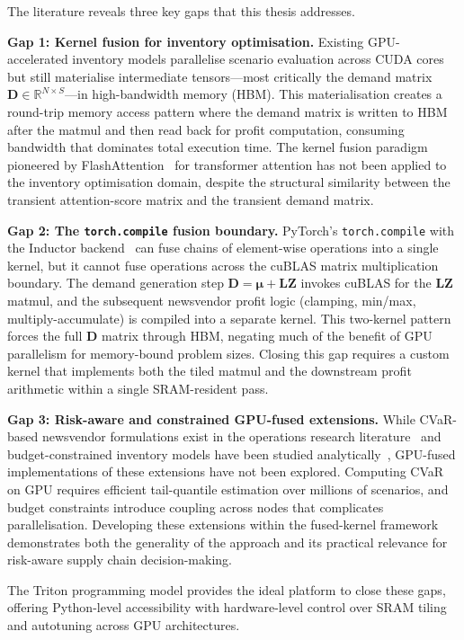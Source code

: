 The literature reveals three key gaps that this thesis addresses.

\textbf{Gap 1: Kernel fusion for inventory optimisation.} Existing GPU-accelerated inventory models parallelise scenario evaluation across CUDA cores but still materialise intermediate tensors---most critically the demand matrix $\mathbf{D} \in \mathbb{R}^{N \times S}$---in high-bandwidth memory (HBM). This materialisation creates a round-trip memory access pattern where the demand matrix is written to HBM after the matmul and then read back for profit computation, consuming bandwidth that dominates total execution time. The kernel fusion paradigm pioneered by FlashAttention~\citep{dao2022} for transformer attention has not been applied to the inventory optimisation domain, despite the structural similarity between the transient attention-score matrix and the transient demand matrix.

\textbf{Gap 2: The \texttt{torch.compile} fusion boundary.} PyTorch's \texttt{torch.compile} with the Inductor backend~\citep{ansel2024} can fuse chains of element-wise operations into a single kernel, but it cannot fuse operations across the cuBLAS matrix multiplication boundary. The demand generation step $\mathbf{D} = \bm{\mu} + \mathbf{L}\mathbf{Z}$ invokes cuBLAS for the $\mathbf{L}\mathbf{Z}$ matmul, and the subsequent newsvendor profit logic (clamping, min/max, multiply-accumulate) is compiled into a separate kernel. This two-kernel pattern forces the full $\mathbf{D}$ matrix through HBM, negating much of the benefit of GPU parallelism for memory-bound problem sizes. Closing this gap requires a custom kernel that implements both the tiled matmul and the downstream profit arithmetic within a single SRAM-resident pass.

\textbf{Gap 3: Risk-aware and constrained GPU-fused extensions.} While CVaR-based newsvendor formulations exist in the operations research literature~\citep{gotoh2007, chen2009} and budget-constrained inventory models have been studied analytically~\citep{porteus2002}, GPU-fused implementations of these extensions have not been explored. Computing CVaR on GPU requires efficient tail-quantile estimation over millions of scenarios, and budget constraints introduce coupling across nodes that complicates parallelisation. Developing these extensions within the fused-kernel framework demonstrates both the generality of the approach and its practical relevance for risk-aware supply chain decision-making.

The Triton programming model provides the ideal platform to close these gaps, offering Python-level accessibility with hardware-level control over SRAM tiling and autotuning across GPU architectures.

